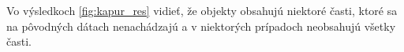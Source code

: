 \documentclass[a4paper,12pt,twoside]{article}%
\begin{document}
Vo výsledkoch \ref{fig:kapur_res} vidieť, že objekty obsahujú niektoré časti, ktoré sa na pôvodných dátach nenachádzajú a v niektorých prípadoch neobsahujú všetky časti. 

\begin{figure}[H]  
    \hspace{5px}

\end{figure}
\end{document}
